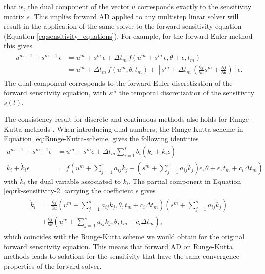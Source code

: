 that is, the dual component of the vector $u$ corresponds exactly to the sensitivity matrix $s$. 
This implies forward AD applied to any multistep linear solver will result in the application of the same solver to the forward sensitivity equation (Equation \eqref{eq:sensitivity_equations}).  
For example, for the forward Euler method this gives 
\begin{align}
\begin{split}
    u^{m+1} + s^{m+1} \, \epsilon 
    &= 
    u^m +  s^m \, \epsilon + \Delta t_m \, f (u^m + s^m \, \epsilon, \theta + \epsilon, t_m) \\
    &= 
    u^m + \Delta t_m \, f(u^m, \theta, t_m) 
    + 
    \left [
    s^m
    + 
    \Delta t_m \,
    \left( 
    \frac{\partial f}{\partial u} s^m + 
    \frac{\partial f}{\partial \theta}
    \right) 
    \right ] \epsilon.
\end{split}
\label{eq:sensitivity-equation-AD}
\end{align}
The dual component corresponds to the forward Euler discretization of the forward sensitivity equation, with $s^m$ the temporal discretization of the sensitivity $s(t)$.

The consistency result for discrete and continuous methods also holds for Runge-Kutta methods \cite{Walther_2007}. 
When introducing dual numbers, the Runge-Kutta scheme in Equation \eqref{eq:Runge-Kutta-scheme} gives the following identities
\begin{align}
    u^{m+1} + s^{m+1} \epsilon 
    &= 
    u^m + s^m  \epsilon + \Delta t_m \sum_{i=1}^s b_i (k_i + \dot k_i \epsilon)
    \\
    k_i + \dot k_i \epsilon
    &= 
    f \left(u^m + \sum_{j=1}^s a_{ij} k_j + \left( s^m + \sum_{j=1}^s a_{ij} \dot k_j \right) \epsilon , \theta + \epsilon ,  t_m + c_i \Delta t_m \right) \label{eq:rk-sensitivity-2}
\end{align}
with $\dot k_i$ the dual variable associated to $k_i$.
The partial component in Equation \eqref{eq:rk-sensitivity-2} carrying the coefficient $\epsilon$ gives 
\begin{align}
\begin{split}
    \dot k_i
    &= 
    \frac{\partial f}{\partial u} 
    \left(u^m + \sum_{j=1}^s a_{ij} k_j, \theta,  t_m + c_i \Delta t_m \right)
    \left( s^m + \sum_{j=1}^s a_{ij} \dot k_j \right) \\
    &+ 
    \frac{\partial f}{\partial \theta} 
    \left(u^m + \sum_{j=1}^s a_{ij} k_j, \theta,  t_m + c_i \Delta t_m \right),
\end{split}
\end{align}
which coincides with the Runge-Kutta scheme we would obtain for the original forward sensitivity equation. 
This means that forward AD on Runge-Kutta methods leads to solutions for the sensitivity that have the same convergence properties of the forward solver. 

